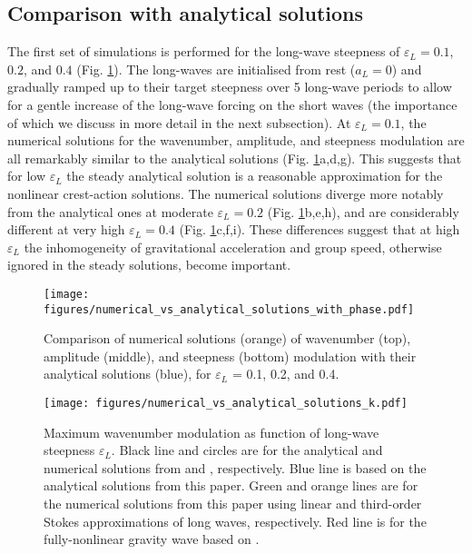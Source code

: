\documentclass[lineno]{jfm}
\begin{document}
\subsection{Comparison with analytical solutions}
\label{subsection:comparison_with_analytical_solutions}

The first set of simulations is performed for the long-wave steepness of
$\varepsilon_L = 0.1$, $0.2$, and $0.4$ (Fig. \ref{fig:numerical_solutions}).
The long-waves are initialised from rest ($a_L = 0$) and gradually ramped up
to their target steepness over 5 long-wave periods to allow for a gentle
increase of the long-wave forcing on the short waves
(the importance of which we discuss in more detail in the next subsection).
At $\varepsilon_L = 0.1$, the numerical solutions for the wavenumber, amplitude,
and steepness modulation are all remarkably similar to the analytical solutions
(Fig. \ref{fig:numerical_solutions}a,d,g).
This suggests that for low $\varepsilon_L$ the steady analytical solution
is a reasonable approximation for the nonlinear crest-action solutions.
The numerical solutions diverge more notably from the analytical ones at
moderate $\varepsilon_L = 0.2$ (Fig. \ref{fig:numerical_solutions}b,e,h),
and are considerably different at very high $\varepsilon_L = 0.4$
(Fig. \ref{fig:numerical_solutions}c,f,i).
These differences suggest that at high $\varepsilon_L$ the inhomogeneity of
gravitational acceleration and group speed, otherwise ignored in the steady
solutions, become important.

\begin{figure}
\centering
\texttt{[image: figures/numerical\_vs\_analytical\_solutions\_with\_phase.pdf]}
\caption{
  Comparison of numerical solutions (orange) of wavenumber (top), amplitude
  (middle), and steepness (bottom) modulation with their analytical solutions
  (blue), for $\varepsilon_L$ = 0.1, 0.2, and 0.4.
}
\label{fig:numerical_solutions}
\end{figure}

\begin{figure}
\centering
\texttt{[image: figures/numerical\_vs\_analytical\_solutions\_k.pdf]}
\caption{
  Maximum wavenumber modulation as function of long-wave steepness $\varepsilon_L$.
  Black line and circles are for the analytical and numerical solutions from
  \citet{longuet1960changes} and \citet{longuet1987propagation}, respectively.
  Blue line is based on the analytical solutions from this paper.
  Green and orange lines are for the numerical solutions from this paper
  using linear and third-order Stokes approximations of long waves, respectively.
  Red line is for the fully-nonlinear gravity wave based on \citet{clamond2018accurate}.
}
\label{fig:numerical_vs_analytical_k}
\end{figure}
\end{document}
